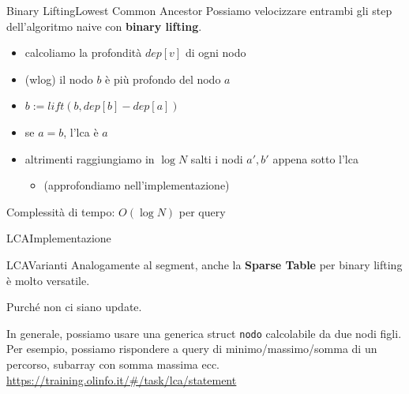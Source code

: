 \documentclass[compress]{beamer}
\begin{document}
\begin{frame}{Binary Lifting}{Lowest Common Ancestor}
    Possiamo velocizzare entrambi gli step dell'algoritmo naive con \textbf{binary lifting}.
    \pause
    \begin{itemize}
        \item calcoliamo la profondit\`a $dep[v]$ di ogni nodo
        \item (wlog) il nodo $b$ \`e pi\`u profondo del nodo $a$
        \item $b := lift(b, dep[b] - dep[a])$
        \item se $a = b$, l'lca \`e $a$
        \item altrimenti raggiungiamo in $\log N$ salti i nodi $a',b'$ appena sotto l'lca
            \begin{itemize}
                \item (approfondiamo nell'implementazione)
            \end{itemize}
    \end{itemize}
    \pause
    Complessit\`a di tempo: $O(\log N)$ per query
\end{frame}

\begin{frame}{LCA}{Implementazione}
\end{frame}

\begin{frame}{LCA}{Varianti}
    Analogamente al segment, anche la \textbf{Sparse Table} per binary lifting \`e molto versatile.
    \pause
    \begin{alertblock}{}
        Purch\'e non ci siano update.
    \end{alertblock}
    \vfill
    \pause
    In generale, possiamo usare una generica struct \texttt{nodo} calcolabile da due nodi figli. Per esempio, possiamo rispondere a query di minimo/massimo/somma di un percorso, subarray con somma massima ecc.
    \vfill
    \small{\underline{\url{https://training.olinfo.it/\#/task/lca/statement}}}
\end{frame}
\end{document}
